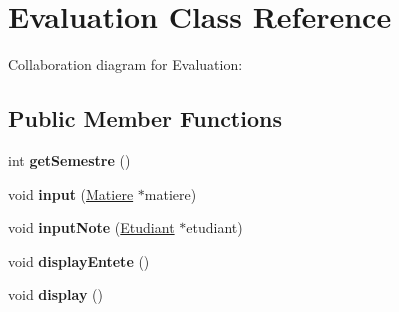 \hypertarget{class_evaluation}{\section{Evaluation Class Reference}
\label{class_evaluation}
}


Collaboration diagram for Evaluation\-:
\subsection*{Public Member Functions}
\begin{DoxyCompactItemize}
\item 
\hypertarget{class_evaluation_afcfea40ab2d5fe63afadb39c31e6fcf1}{int {\bfseries get\-Semestre} ()}\label{class_evaluation_afcfea40ab2d5fe63afadb39c31e6fcf1}

\item 
\hypertarget{class_evaluation_a484f8a84df83eedae55068678de9a1d6}{void {\bfseries input} (\hyperlink{class_matiere}{Matiere} $\ast$matiere)}\label{class_evaluation_a484f8a84df83eedae55068678de9a1d6}

\item 
\hypertarget{class_evaluation_a8088003bc92b542bde25e913aa81b154}{void {\bfseries input\-Note} (\hyperlink{class_etudiant}{Etudiant} $\ast$etudiant)}\label{class_evaluation_a8088003bc92b542bde25e913aa81b154}

\item 
\hypertarget{class_evaluation_af2c1d5b6bf1594be54e01050f79db98c}{void {\bfseries display\-Entete} ()}\label{class_evaluation_af2c1d5b6bf1594be54e01050f79db98c}

\item 
\hypertarget{class_evaluation_a2dfd725e201bf995fac36111ad12d6ac}{void {\bfseries display} ()}\label{class_evaluation_a2dfd725e201bf995fac36111ad12d6ac}

\end{DoxyCompactItemize}
